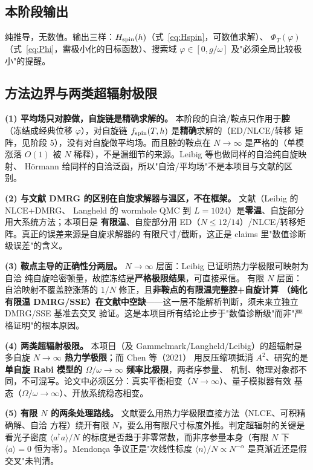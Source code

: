\documentclass[UTF8,11pt,a4paper]{ctexart}
\begin{document}
\subsection{本阶段输出}

纯推导，无数值。输出三样：$H_{\rm spin}(h)$（式~\eqref{eq:Hspin}，可数值求解）、
$\Phi_T(\varphi)$（式~\eqref{eq:Phi}，需极小化的目标函数）、搜索域 $\varphi\in[0,g/\omega]$
及"必须全局比较极小"的提醒。

\subsection{方法边界与两类超辐射极限}

\textbf{(1) 平均场只对腔做，自旋链是精确求解的。} 本阶段的自洽/鞍点只作用于\textbf{腔}
（冻结成经典位移 $\varphi$），对自旋链 $f_{\rm spin}(T,h)$ 是\textbf{精确}求解的（ED/NLCE/转移
矩阵，见阶段 5），没有对自旋做平均场。而且腔的鞍点在 $N\to\infty$ 是严格的（单模涨落 $O(1)$
被 $N$ 稀释），不是漏细节的来源。Leibig 等也做同样的自洽纯自旋映射\cite{Leibig2026SelfConsistent}、
Hörmann 给同样的自洽泛函\cite{Hormann2026Folds}，所以"自洽/平均场"不是本项目与文献的区别。

\textbf{(2) 与文献 DMRG 的区别在自旋求解器与温区，不在框架。} 文献（Leibig 的 NLCE+DMRG、
Langheld 的 wormhole QMC 到 $L=1024$）是\textbf{零温}、自旋部分用大系统方法；本项目是
\textbf{有限温}、自旋部分用 ED（$N\le12/14$）/NLCE/转移矩阵。真正的误差来源是自旋求解器的
有限尺寸/截断，这正是 claims 里"数值诊断级误差"的含义。

\textbf{(3) 鞍点主导的正确性分两层。} $N\to\infty$ 层面：Leibig 已证明热力学极限可映射为自洽
纯自旋哈密顿量\cite{Leibig2026SelfConsistent}，故腔冻结是\textbf{严格极限结果}，可直接采信。
有限 $N$ 层面：自洽映射不覆盖腔涨落的 $1/N$ 修正，且\textbf{非鞍点的有限温完整腔+自旋计算
（纯化有限温 DMRG/SSE）在文献中空缺}——这一层不能解析判断，须未来立独立 DMRG/SSE 基准去交叉
验证。这是本项目所有结论止步于"数值诊断级"而非"严格证明"的根本原因。

\textbf{(4) 两类超辐射极限。} 本项目（及 Gammelmark/Langheld/Leibig）的超辐射是多自旋
\textbf{$N\to\infty$ 热力学极限}；而 Chen 等（2021）\cite{Chen2021Antisqueezing} 用反压缩项抵消
$A^2$、研究的是\textbf{单自旋 Rabi 模型的 $\Omega/\omega\to\infty$ 频率比极限}，两者序参量、
机制、物理对象都不同，不可混写。论文中必须区分：真实平衡相变（$N\to\infty$）、量子模拟器有效
基态（$\Omega/\omega\to\infty$）、开放系统稳态相变。

\textbf{(5) 有限 $N$ 的两条处理路线。} 文献要么用热力学极限直接方法（NLCE、可积精确解、自洽
方程）绕开有限 $N$，要么用有限尺寸标度外推。判定超辐射的关键是看光子密度
$\langle a^\dagger a\rangle/N$ 的标度是否趋于非零常数，而非序参量本身（有限 $N$ 下
$\langle a\rangle=0$ 恒为零）。Mendonça 争议正是"次线性标度
$\langle n\rangle/N\propto N^{-\alpha}$ 是真渐近还是假交叉"未判清。
\end{document}

